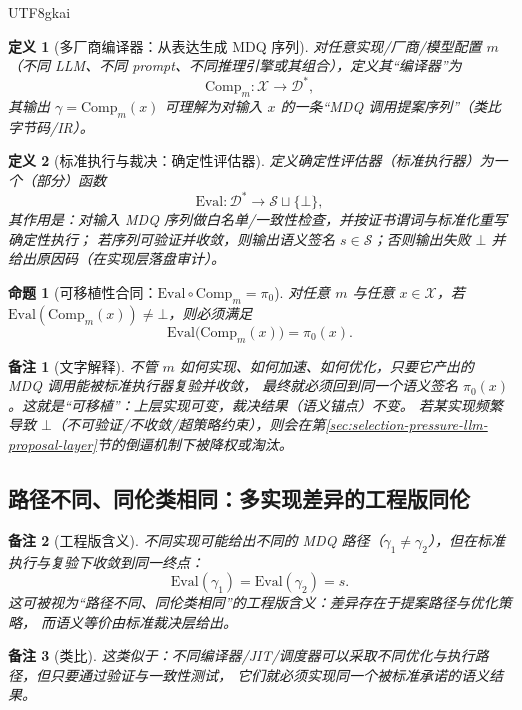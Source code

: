 \documentclass[12pt]{article}
\newtheorem{definition}{定义}[section]
\newtheorem{proposition}{命题}[section]
\newtheorem{remark}{备注}[section]
\begin{document}
\begin{CJK*}{UTF8}{gkai}
\begin{definition}[多厂商编译器：从表达生成 MDQ 序列]
对任意实现/厂商/模型配置 $m$（不同 LLM、不同 prompt、不同推理引擎或其组合），定义其“编译器”为
\[
\mathrm{Comp}_m:\mathcal{X}\to \mathcal{D}^{\ast},
\]
其输出 $\gamma=\mathrm{Comp}_m(x)$ 可理解为对输入 $x$ 的一条“MDQ 调用提案序列”（类比字节码/IR）。
\end{definition}

\begin{definition}[标准执行与裁决：确定性评估器]
定义确定性评估器（标准执行器）为一个（部分）函数
\[
\mathrm{Eval}:\mathcal{D}^{\ast}\to \mathcal{S}\sqcup\{\bot\},
\]
其作用是：对输入 MDQ 序列做白名单/一致性检查，并按证书谓词与标准化重写确定性执行；
若序列可验证并收敛，则输出语义签名 $s\in\mathcal{S}$；否则输出失败 $\bot$ 并给出原因码（在实现层落盘审计）。
\end{definition}

\begin{proposition}[可移植性合同：\texorpdfstring{$\mathrm{Eval}\circ \mathrm{Comp}_m=\pi_0$}{Eval∘Comp=pi0}]
\label{prop:portability-contract}
对任意 $m$ 与任意 $x\in\mathcal{X}$，若 $\mathrm{Eval}(\mathrm{Comp}_m(x))\neq \bot$，则必须满足
\[
\mathrm{Eval}\bigl(\mathrm{Comp}_m(x)\bigr)=\pi_0(x).
\]
\end{proposition}

\begin{remark}[文字解释]
不管 $m$ 如何实现、如何加速、如何优化，只要它产出的 MDQ 调用能被标准执行器复验并收敛，
最终就必须回到同一个语义签名 $\pi_0(x)$。这就是“可移植”：上层实现可变，裁决结果（语义锚点）不变。
若某实现频繁导致 $\bot$（不可验证/不收敛/超策略约束），则会在第\ref{sec:selection-pressure-llm-proposal-layer}节的倒逼机制下被降权或淘汰。
\end{remark}

\subsection{路径不同、同伦类相同：多实现差异的工程版同伦}
\label{subsec:path-homotopy-osjvm}

\begin{remark}[工程版含义]
不同实现可能给出不同的 MDQ 路径（$\gamma_1\neq \gamma_2$），但在标准执行与复验下收敛到同一终点：
\[
\mathrm{Eval}(\gamma_1)=\mathrm{Eval}(\gamma_2)=s.
\]
这可被视为“路径不同、同伦类相同”的工程版含义：差异存在于提案路径与优化策略，
而语义等价由标准裁决层给出。
\end{remark}

\begin{remark}[类比]
这类似于：不同编译器/JIT/调度器可以采取不同优化与执行路径，但只要通过验证与一致性测试，
它们就必须实现同一个被标准承诺的语义结果。
\end{remark}


\end{CJK*}
\end{document}
